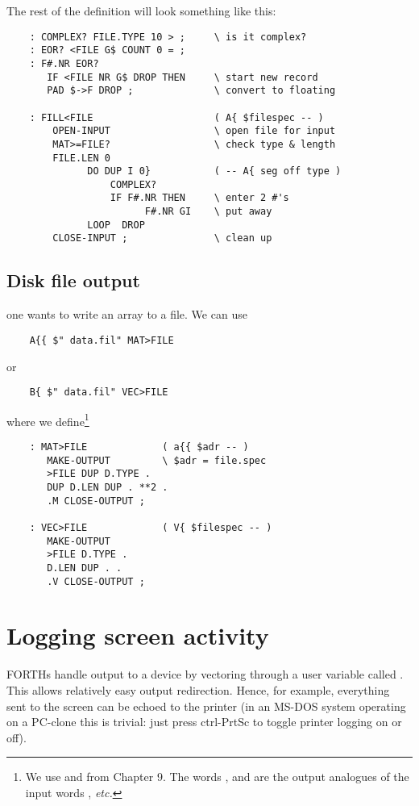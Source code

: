 The rest of the definition will look something like this:

\begin{lstlisting}
    : COMPLEX? FILE.TYPE 10 > ;     \ is it complex?
    : EOR? <FILE G$ COUNT 0 = ;
    : F#.NR EOR?
       IF <FILE NR G$ DROP THEN     \ start new record
       PAD $->F DROP ;              \ convert to floating

    : FILL<FILE                     ( A{ $filespec -- )
        OPEN-INPUT                  \ open file for input
        MAT>=FILE?                  \ check type & length
        FILE.LEN 0
              DO DUP I 0}           ( -- A{ seg off type )
                  COMPLEX?
                  IF F#.NR THEN     \ enter 2 #'s
                        F#.NR GI    \ put away
              LOOP  DROP
        CLOSE-INPUT ;               \ clean up
\end{lstlisting}

\subsection{Disk file output}

 one wants to write an array to a file.
We can use

\begin{lstlisting}
    A{{ $" data.fil" MAT>FILE
\end{lstlisting}
or
\begin{lstlisting}
    B{ $" data.fil" VEC>FILE
\end{lstlisting}

where we define\footnote{We use  and  from Chapter 9. The words ,  and  are the output analogues of the input words , \textit{etc.}}

\begin{lstlisting}
    : MAT>FILE             ( a{{ $adr -- )
       MAKE-OUTPUT         \ $adr = file.spec
       >FILE DUP D.TYPE .
       DUP D.LEN DUP . **2 .
       .M CLOSE-OUTPUT ;

    : VEC>FILE             ( V{ $filespec -- )
       MAKE-OUTPUT
       >FILE D.TYPE .
       D.LEN DUP . .
       .V CLOSE-OUTPUT ;
\end{lstlisting}

\section{Logging screen activity}
 FORTHs handle output to a device by vectoring through a user variable called . This allows relatively easy output redirection. Hence, for example, everything sent to the screen can be echoed to the printer (in an MS-DOS system operating on a PC-clone this is trivial: just press ctrl-PrtSc to toggle printer logging on or off).

